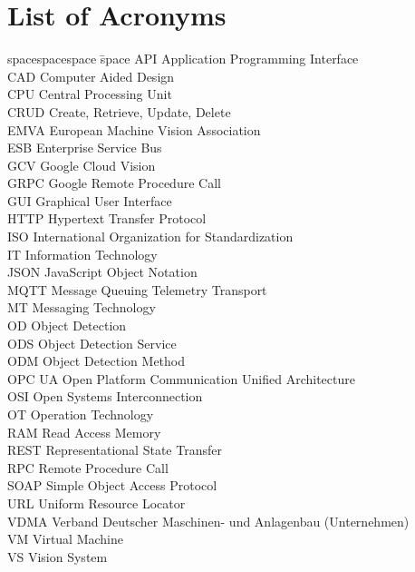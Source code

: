\chapter*{List of Acronyms}
\thispagestyle{empty}
\begin{tabbing}
spacespacespace \= space \kill
API	 \> 	Application Programming Interface	 \\
CAD	 \> 	Computer Aided Design	 \\
CPU	 \> 	Central Processing Unit	 \\
CRUD	 \> 	Create, Retrieve, Update, Delete	 \\
EMVA \> European Machine Vision Association\\
ESB	\>	Enterprise Service Bus \\
GCV	\>	Google Cloud Vision \\
GRPC     \>  Google Remote Procedure Call\\
GUI	\>	Graphical User Interface \\
HTTP	 \> 	Hypertext Transfer Protocol	 \\
ISO    \>  International Organization for Standardization\\
IT  \>  Information Technology\\
JSON	\>	JavaScript Object Notation \\
MQTT     \>  Message Queuing Telemetry Transport\\
MT      \> Messaging Technology\\
OD     \>  Object Detection\\
ODS     \>  Object Detection Service\\
ODM     \>  Object Detection Method\\
OPC UA     \>  Open Platform Communication Unified Architecture\\
OSI     \>  Open Systems Interconnection\\
OT  \> Operation Technology\\
RAM    \> Read Access Memory \\
REST    \> Representational State Transfer \\
RPC    \> Remote Procedure Call \\
SOAP	 \> 	Simple Object Access Protocol	 \\
URL	 \> 	Uniform Resource Locator	 \\
VDMA \>     Verband Deutscher Maschinen- und Anlagenbau (Unternehmen) \\
VM	 \> 	Virtual Machine	 \\
VS  \>  Vision System\\
\end{tabbing}
\endinput

